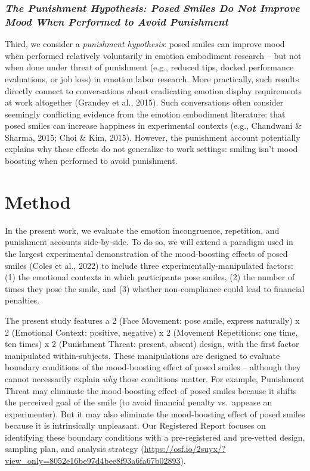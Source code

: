 \documentclass[
  letterpaper,
  DIV=11,
  numbers=noendperiod]{scrartcl}
\begin{document}
\subsubsection{\texorpdfstring{\textbf{\emph{The Punishment Hypothesis:
Posed Smiles Do Not Improve Mood When Performed to Avoid
Punishment}}}{The Punishment Hypothesis: Posed Smiles Do Not Improve Mood When Performed to Avoid Punishment}}\label{the-punishment-hypothesis-posed-smiles-do-not-improve-mood-when-performed-to-avoid-punishment}

Third, we consider a \emph{punishment hypothesis}: posed smiles can
improve mood when performed relatively voluntarily in emotion embodiment
research -- but not when done under threat of punishment (e.g., reduced
tips, docked performance evaluations, or job loss) in emotion labor
research. More practically, such results directly connect to
conversations about eradicating emotion display requirements at work
altogether (Grandey et al., 2015). Such conversations often consider
seemingly conflicting evidence from the emotion embodiment literature:
that posed smiles can increase happiness in experimental contexts (e.g.,
Chandwani \& Sharma, 2015; Choi \& Kim, 2015). However, the punishment
account potentially explains why these effects do not generalize to work
settings: smiling isn't mood boosting when performed to avoid
punishment.

\section{Method}\label{method}

In the present work, we evaluate the emotion incongruence, repetition,
and punishment accounts side-by-side. To do so, we will extend a
paradigm used in the largest experimental demonstration of the
mood-boosting effects of posed smiles ({Coles et al.}, 2022) to include
three experimentally-manipulated factors: (1) the emotional contexts in
which participants pose smiles, (2) the number of times they pose the
smile, and (3) whether non-compliance could lead to financial penalties.

The present study features a 2 (Face Movement: pose smile, express
naturally) x 2 (Emotional Context: positive, negative) x 2 (Movement
Repetitions: one time, ten times) x 2 (Punishment Threat: present,
absent) design, with the first factor manipulated within-subjects. These
manipulations are designed to evaluate boundary conditions of the
mood-boosting effect of posed smiles -- although they cannot necessarily
explain \emph{why} those conditions matter. For example, Punishment
Threat may eliminate the mood-boosting effect of posed smiles because it
shifts the perceived goal of the smile (to avoid financial penalty
vs.~appease an experimenter). But it may also eliminate the
mood-boosting effect of posed smiles because it is intrinsically
unpleasant. Our Registered Report focuses on identifying these boundary
conditions with a pre-registered and pre-vetted design, sampling plan,
and analysis strategy
(\url{https://osf.io/2suyx/?view_only=8052e16be97d4bee8f93a6fa67b02893}).
\end{document}
